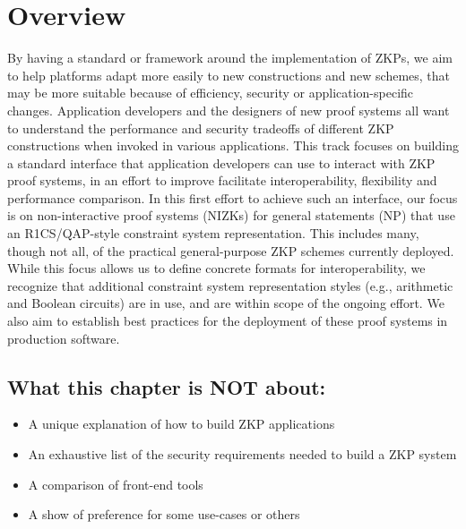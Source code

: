 \section{Overview}
\label{implem:overview}
 
By having a standard or framework around the implementation of ZKPs, we aim to help platforms adapt more easily to new constructions and new schemes, that may be more suitable because of efficiency, security or application-specific changes.
Application developers and the designers of new proof systems all want to understand the performance and security tradeoffs of different ZKP constructions when invoked in various applications.
This track focuses on building a standard interface that application developers can use to interact with ZKP proof systems, in an effort to improve facilitate interoperability, flexibility and performance comparison.
In this first effort to achieve such an interface, our focus is on non-interactive proof systems (NIZKs) for general statements (NP) that use an R1CS/QAP-style constraint system representation.
This includes many, though not all, of the practical general-purpose ZKP schemes currently deployed.
While this focus allows us to define concrete formats for interoperability, we recognize that additional constraint system representation styles (e.g., arithmetic and Boolean circuits) are in use, and are within scope of the ongoing effort.
We also aim to establish best practices for the deployment of these proof systems in production software.



\subsection{What this chapter is NOT about:}
\label{implem:overview:not-about}

\begin{itemize}
 \item A unique explanation of how to build ZKP applications
 \item An exhaustive list of the security requirements needed to build a ZKP system
 \item A comparison of front-end tools
 \item A show of preference for some use-cases or others
\end{itemize}
